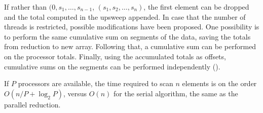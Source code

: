 
If rather than $(0,s_1,\ldots,s_{n-1}$, $(s_1,s_2,\ldots,s_n)$, the first element can be dropped and the total computed in the upsweep appended. In case that the number of threads is restricted, possible modifications have been proposed. One possibility is to perform the same cumulative sum on segments of the data, saving the totals from reduction to new array. Following that, a cumulative sum can be performed on the processor totals. Finally, using the accumulated totals as offsets, cumulative sums on the segments can be performed independently (\cite{blelloch1990}).


If $P$ processors are available, the time required to scan $n$ elements is on the order $O(n/P + \log_2P)$, versus $O(n)$ for the serial algorithm, the same as the parallel reduction.





